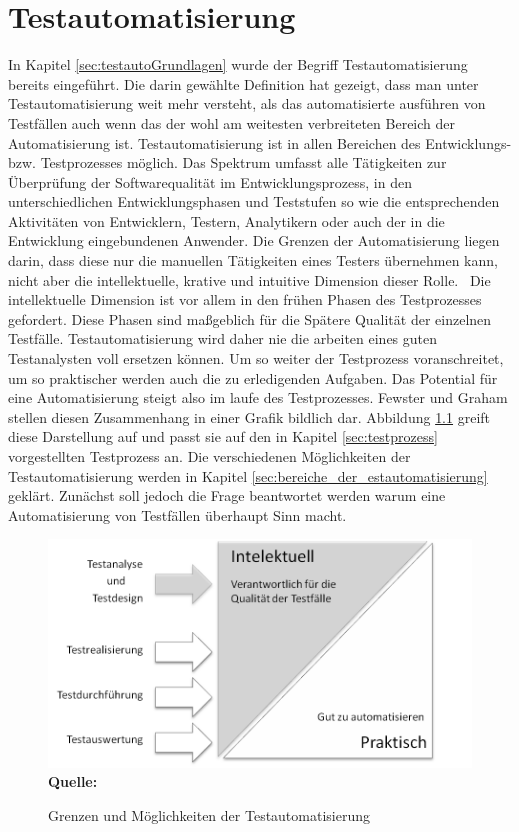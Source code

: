 \chapter{Testautomatisierung}
\label{sec:testautomatisierung}
In Kapitel \ref{sec:testautoGrundlagen} wurde der Begriff Testautomatisierung bereits eingeführt. Die darin gewählte Definition hat gezeigt, dass man unter Testautomatisierung weit mehr versteht, als das automatisierte ausführen von Testfällen auch wenn das der wohl am weitesten verbreiteten Bereich der Automatisierung ist.
Testautomatisierung ist in allen Bereichen des Entwicklungs- bzw. Testprozesses möglich.
\glqq Das Spektrum umfasst alle Tätigkeiten zur Überprüfung der Softwarequalität im Entwicklungsprozess, in den unterschiedlichen Entwicklungsphasen und Teststufen so wie die entsprechenden Aktivitäten von Entwicklern, Testern, Analytikern oder auch der in die Entwicklung eingebundenen Anwender. Die Grenzen der Automatisierung liegen darin, dass diese nur die manuellen Tätigkeiten eines Testers übernehmen kann, nicht aber die intellektuelle, krative und intuitive Dimension dieser Rolle.\grqq\ \cite[S. 7]{seidl_basiswissen_2012}
Die intellektuelle Dimension ist vor allem in den frühen Phasen des Testprozesses gefordert. Diese Phasen sind maßgeblich für die Spätere Qualität der einzelnen Testfälle. Testautomatisierung wird daher nie die arbeiten eines guten Testanalysten voll ersetzen können. Um so weiter der Testprozess voranschreitet, um so praktischer werden auch die zu erledigenden Aufgaben. Das Potential für eine Automatisierung steigt also im laufe des Testprozesses.
Fewster und Graham stellen diesen Zusammenhang in einer Grafik bildlich dar. \cite[vgl. S.18]{fewster_software_1999} Abbildung \ref{fig:intellektuellVsPraktisch} greift diese Darstellung auf und passt sie auf den in Kapitel \ref{sec:testprozess} vorgestellten Testprozess an. Die verschiedenen Möglichkeiten der Testautomatisierung werden in Kapitel \ref{sec:bereiche_der_estautomatisierung} geklärt. Zunächst soll jedoch die Frage beantwortet werden warum eine Automatisierung von Testfällen überhaupt Sinn macht.

\begin{figure}[htb]
  \centering  
  \includegraphics[scale=1]{img/intelektuellVsPraktisch.png}\\
  \footnotesize\sffamily\textbf{Quelle:} \cite[vgl. S.18]{fewster_software_1999}
  \caption{Grenzen und Möglichkeiten der Testautomatisierung}
  \label{fig:intellektuellVsPraktisch}
\end{figure}


